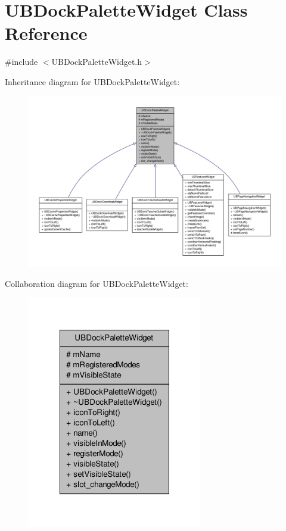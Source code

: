 \hypertarget{class_u_b_dock_palette_widget}{\section{U\-B\-Dock\-Palette\-Widget Class Reference}
\label{d1/d54/class_u_b_dock_palette_widget}
}


{\ttfamily \#include $<$U\-B\-Dock\-Palette\-Widget.\-h$>$}



Inheritance diagram for U\-B\-Dock\-Palette\-Widget\-:
\nopagebreak
\begin{figure}[H]
\begin{center}
\leavevmode
\includegraphics[width=350pt]{de/d80/class_u_b_dock_palette_widget__inherit__graph}
\end{center}
\end{figure}


Collaboration diagram for U\-B\-Dock\-Palette\-Widget\-:
\nopagebreak
\begin{figure}[H]
\begin{center}
\leavevmode
\includegraphics[width=216pt]{dc/d53/class_u_b_dock_palette_widget__coll__graph}
\end{center}
\end{figure}
